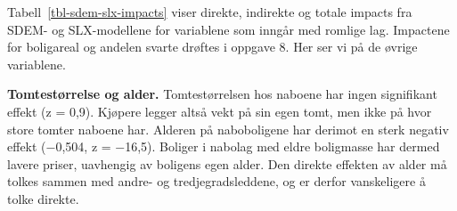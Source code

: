 \documentclass[
  norsk,
  a4paper,
]{article}
\begin{document}
\begin{table}

\caption{\label{tbl-sdem-slx-impacts}Direkte, indirekte og totale
impacts fra SDEM og SLX (k = 10). z-verdier i parentes.}


\end{table}%

Tabell~\ref{tbl-sdem-slx-impacts} viser direkte, indirekte og totale
impacts fra SDEM- og SLX-modellene for variablene som inngår med romlige
lag. Impactene for boligareal og andelen svarte drøftes i oppgave 8. Her
ser vi på de øvrige variablene.

\textbf{Tomtestørrelse og alder.} Tomtestørrelsen hos naboene har ingen
signifikant effekt (z = 0,9). Kjøpere legger altså vekt på sin egen
tomt, men ikke på hvor store tomter naboene har. Alderen på naboboligene
har derimot en sterk negativ effekt (−0,504, z = −16,5). Boliger i
nabolag med eldre boligmasse har dermed lavere priser, uavhengig av
boligens egen alder. Den direkte effekten av alder må tolkes sammen med
andre- og tredjegradsleddene, og er derfor vanskeligere å tolke direkte.
\end{document}
